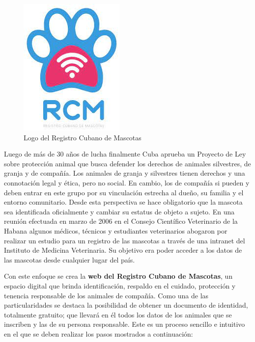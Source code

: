 \begin{figure}[h!]
	\begin{center}
		\includegraphics[scale=0.4]{Graphics/images/LogodelRegistroCubanodeMascotas.jpg}
		\caption{Logo del Registro Cubano de Mascotas}
		\label{fig:rcm}
		
	\end{center}
\end{figure}


Luego de más de 30 años de lucha finalmente Cuba aprueba un Proyecto de Ley sobre protección animal que busca defender los derechos de animales silvestres, de granja y de compañía. Los animales de granja y silvestres tienen derechos y una connotación legal y ética, pero no social. En cambio, los de compañía si pueden y deben entrar en este grupo por su vinculación estrecha al dueño, su familia y el entorno comunitario. Desde esta perspectiva se hace obligatorio que la mascota sea identificada oficialmente y cambiar su estatus de objeto a sujeto. En una reunión efectuada en marzo de 2006 en el Consejo Científico Veterinario de la Habana algunos médicos, técnicos y estudiantes veterinarios abogaron por realizar un estudio para un registro de las mascotas a través de una intranet del Instituto de Medicina Veterinaria. Su objetivo era poder acceder a los datos de las mascotas desde cualquier lugar del país.

Con este enfoque se crea la \textbf{web del Registro Cubano de Mascotas}, un espacio digital que brinda identificación, respaldo en el cuidado, protección y tenencia responsable de los animales de compañía. Como una de las particularidades se destaca la posibilidad de obtener un documento de identidad, totalmente gratuito; que llevará en él todos los datos de los animales que se inscriben y las de su persona responsable. Este es un proceso sencillo e intuitivo en el que se deben realizar los pasos mostrados a continuación:

